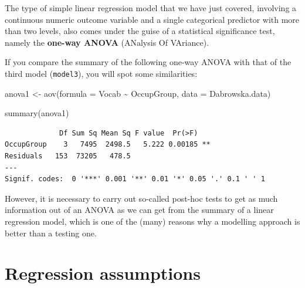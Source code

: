 \documentclass[
  letterpaper,
  DIV=11,
  numbers=noendperiod]{scrreprt}
\newenvironment{Shaded}{\begin{snugshade}}{\end{snugshade}}
\newcommand{\AttributeTok}[1]{\textcolor[rgb]{0.40,0.45,0.13}{#1}}
\newcommand{\FunctionTok}[1]{\textcolor[rgb]{0.28,0.35,0.67}{#1}}
\newcommand{\NormalTok}[1]{\textcolor[rgb]{0.00,0.23,0.31}{#1}}
\newcommand{\OtherTok}[1]{\textcolor[rgb]{0.00,0.23,0.31}{#1}}
\newcommand{\SpecialCharTok}[1]{\textcolor[rgb]{0.37,0.37,0.37}{#1}}
\begin{document}
\begin{tcolorbox}[enhanced jigsaw, arc=.35mm, bottomrule=.15mm, bottomtitle=1mm, breakable, colback=white, colbacktitle=quarto-callout-note-color!10!white, colframe=quarto-callout-note-color-frame, coltitle=black, left=2mm, leftrule=.75mm, opacityback=0, opacitybacktitle=0.6, rightrule=.15mm, title=\textcolor{quarto-callout-note-color}{\faInfo}\hspace{0.5em}{What about ANOVAs?~\emoji{thinking}}, titlerule=0mm, toprule=.15mm, toptitle=1mm]

The type of simple linear regression model that we have just covered,
involving a continuous numeric outcome variable and a single categorical
predictor with more than two levels, also comes under the guise of a
statistical significance test, namely the \textbf{one-way ANOVA}
(ANalysis Of VAriance).

If you compare the summary of the following one-way ANOVA with that of
the third model (\texttt{model3}), you will spot some similarities:

\begin{Shaded}
\begin{Highlighting}[]
\NormalTok{anova1 }\OtherTok{\textless{}{-}} \FunctionTok{aov}\NormalTok{(}\AttributeTok{formula =}\NormalTok{ Vocab }\SpecialCharTok{\textasciitilde{}}\NormalTok{ OccupGroup, }
    \AttributeTok{data =}\NormalTok{ Dabrowska.data)}

\FunctionTok{summary}\NormalTok{(anova1)}
\end{Highlighting}
\end{Shaded}

\begin{verbatim}
             Df Sum Sq Mean Sq F value  Pr(>F)   
OccupGroup    3   7495  2498.5   5.222 0.00185 **
Residuals   153  73205   478.5                   
---
Signif. codes:  0 '***' 0.001 '**' 0.01 '*' 0.05 '.' 0.1 ' ' 1
\end{verbatim}

However, it is necessary to carry out so-called post-hoc tests to get as
much information out of an ANOVA as we can get from the summary of a
linear regression model, which is one of the (many) reasons why a
modelling approach is better than a testing one.

\end{tcolorbox}

\section{Regression assumptions}\label{sec-AssumptionsLR}
\end{document}
